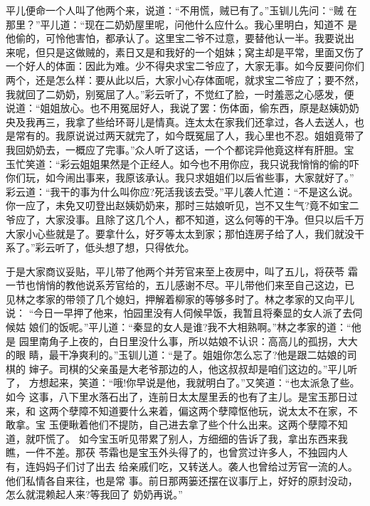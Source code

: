 平儿便命一个人叫了他两个来，说道：“不用慌，贼已有了。”玉钏儿先问：“贼
在那里？”平儿道：“现在二奶奶屋里呢，问他什么应什么。我心里明白，知道不
是他偷的，可怜他害怕，都承认了。这里宝二爷不过意，要替他认一半。我要说出
来呢，但只是这做贼的，素日又是和我好的一个姐妹；窝主却是平常，里面又伤了
一个好人的体面：因此为难。少不得央求宝二爷应了，大家无事。如今反要问你们
两个，还是怎么样：要从此以后，大家小心存体面呢，就求宝二爷应了；要不然，
我就回了二奶奶，别冤屈了人。”彩云听了，不觉红了脸，一时羞恶之心感发，便
说道：“姐姐放心。也不用冤屈好人，我说了罢：伤体面，偷东西，原是赵姨奶奶
央及我再三，我拿了些给环哥儿是情真。连太太在家我们还拿过，各人去送人，也
是常有的。我原说说过两天就完了，如今既冤屈了人，我心里也不忍。姐姐竟带了
我回奶奶去，一概应了完事。”众人听了这话，一个个都诧异他竟这样有肝胆。宝
玉忙笑道：“彩云姐姐果然是个正经人。如今也不用你应，我只说我悄悄的偷的吓
你们玩，如今闹出事来，我原该承认。我只求姐姐们以后省些事，大家就好了。”
彩云道：“我干的事为什么叫你应?死活我该去受。”平儿袭人忙道：“不是这么说。
你一应了，未免又叨登出赵姨奶奶来，那时三姑娘听见，岂不又生气?竟不如宝二
爷应了，大家没事。且除了这几个人，都不知道，这么何等的干净。但只以后千万
大家小心些就是了。要拿什么，好歹等太太到家；那怕连房子给了人，我们就没干
系了。”彩云听了，低头想了想，只得依允。

于是大家商议妥贴，平儿带了他两个并芳官来至上夜房中，叫了五儿，将茯苓
霜一节也悄悄的教他说系芳官给的，五儿感谢不尽。平儿带他们来至自己这边，已
见林之孝家的带领了几个媳妇，押解着柳家的等够多时了。林之孝家的又向平儿说：
“今日一早押了他来，怕园里没有人伺候早饭，我暂且将秦显的女人派了去伺候姑
娘们的饭呢。”平儿道：“秦显的女人是谁?我不大相熟啊。”林之孝家的道：“他是
园里南角子上夜的，白日里没什么事，所以姑娘不认识：高高儿的孤拐，大大的眼
睛，最干净爽利的。”玉钏儿道：“是了。姐姐你怎么忘了?他是跟二姑娘的司棋的
婶子。司棋的父亲虽是大老爷那边的人，他这叔叔却是咱们这边的。”平儿听了，
方想起来，笑道：“哦!你早说是他，我就明白了。”又笑道：“也太派急了些。如今
这事，八下里水落石出了，连前日太太屋里丢的也有了主儿。是宝玉那日过来，和
这两个孽障不知道要什么来着，偏这两个孽障怄他玩，说太太不在家，不敢拿。宝
玉便瞅着他们不提防，自己进去拿了些个什么出来。这两个孽障不知道，就吓慌了。
如今宝玉听见带累了别人，方细细的告诉了我，拿出东西来我瞧，一件不差。那茯
苓霜也是宝玉外头得了的，也曾赏过许多人，不独园内人有，连妈妈子们讨了出去
给亲戚们吃，又转送人。袭人也曾给过芳官一流的人。他们私情各自来往，也是常
事。前日那两篓还摆在议事厅上，好好的原封没动，怎么就混赖起人来?等我回了
奶奶再说。”

